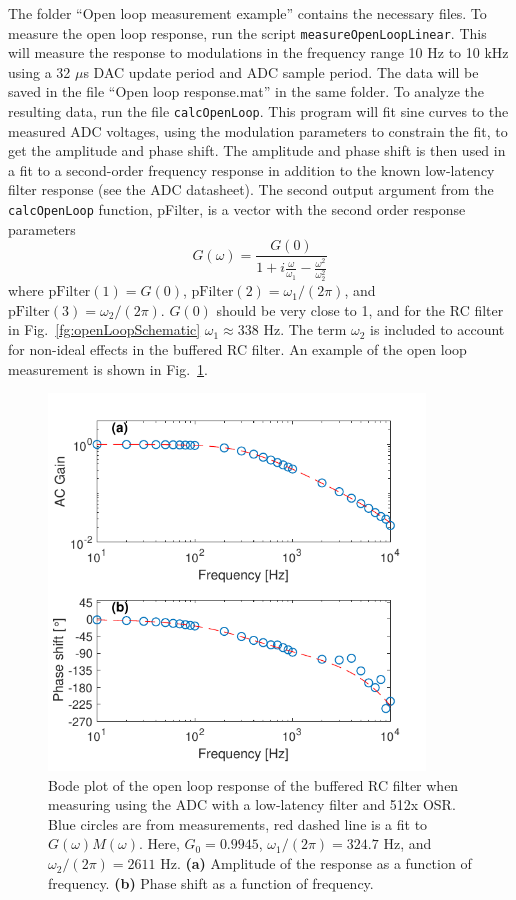 \documentclass{article}
\begin{document}
The folder ``Open loop measurement example'' contains the necessary files.  To measure the open loop response, run the script \verb|measureOpenLoopLinear|.  This will measure the response to modulations in the frequency range 10 Hz to 10 kHz using a 32 $\mu$s DAC update period and ADC sample period.  The data will be saved in the file ``Open loop response.mat'' in the same folder.  To analyze the resulting data, run the file \verb|calcOpenLoop|.  This program will fit sine curves to the measured ADC voltages, using the modulation parameters to constrain the fit, to get the amplitude and phase shift.  The amplitude and phase shift is then used in a fit to a second-order frequency response in addition to the known low-latency filter response (see the ADC datasheet).  The second output argument from the \verb|calcOpenLoop| function, pFilter, is a vector with the second order response parameters
\begin{equation}
G(\omega) = \frac{G(0)}{1+i\frac{\omega}{\omega_1} -\frac{\omega^2}{\omega_2^2}}
\label{eq:secondOrderResponse}
\end{equation}
where $\text{pFilter}(1) = G(0)$, $\text{pFilter}(2) = \omega_1/(2\pi)$, and $\text{pFilter}(3) = \omega_2/(2\pi)$.  $G(0)$ should be very close to 1, and for the RC filter in Fig.~\ref{fg:openLoopSchematic} $\omega_1 \approx 338$ Hz.  The term $\omega_2$ is included to account for non-ideal effects in the buffered RC filter.  An example of the open loop measurement is shown in Fig.~\ref{fg:openLoopMeas}.
\begin{figure}[htbp]
	\centering
	\includegraphics[width=10cm]{OpenLoop.pdf}
	\caption{Bode plot of the open loop response of the buffered RC filter when measuring using the ADC with a low-latency filter and 512x OSR.  Blue circles are from measurements, red dashed line is a fit to $G(\omega)M(\omega)$.  Here, $G_0 = 0.9945$, $\omega_1/(2\pi) = 324.7$ Hz, and $\omega_2/(2\pi) = 2611$ Hz.  \textbf{(a)} Amplitude of the response as a function of frequency.  \textbf{(b)} Phase shift as a function of frequency.}
	\label{fg:openLoopMeas}
\end{figure}
\end{document}
